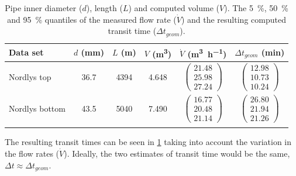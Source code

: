 \begin{table} [h]
\centering
\caption{Pipe inner diameter ($d$), length ($L$) and computed volume ($V$). The \SI{5}{\percent}, \SI{50}{\percent} and \SI{95}{\percent} quantiles of the measured flow rate ($\dot{V}$) and the resulting computed transit time ($\Delta t_{geom}$).}
\label{tab:vg-geometry}
\begin{tabular}{lccccc}
Data set & $d$ (\si{\milli\meter}) & $L$ (\si{\meter}) & $V$ (\si{\cubic\meter}) & $\dot{V}$ (\si{\cubic\meter\per\hour}) & $\Delta t_{geom}$ (\si{\minute})\\
\hline
\addlinespace[1.5ex]

Nordlys top    & \num{36.7} & \num{4394} & \num{4.648} &
  $\begin{pmatrix}  21.48\\ 25.98\\ 27.24 \end{pmatrix}$ &
  $\begin{pmatrix}  12.98\\ 10.73\\ 10.24 \end{pmatrix}$ \\
\addlinespace[2.0ex]

Nordlys bottom & \num{43.5} & \num{5040} & \num{7.490} &
  $\begin{pmatrix}  16.77\\ 20.48\\ 21.14 \end{pmatrix}$ &
  $\begin{pmatrix}  26.80\\ 21.94\\ 21.26 \end{pmatrix}$\\
  
\addlinespace[1.0ex]
\hline
\end{tabular}
\end{table}

The resulting transit times can be seen in \cref{tab:vg-geometry} taking into account the variation in the flow rates ($\dot{V}$). Ideally, the two estimates of transit time would be the same, $\Delta t \approx \Delta t_{geom}$. 

